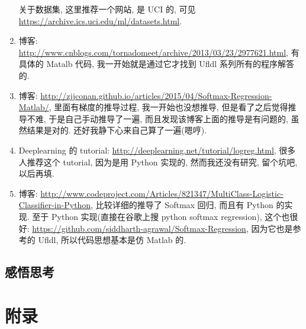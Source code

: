 \documentclass[a4paper,UTF8]{ctexart}
\theoremstyle{plain} \newtheorem{theorem}{定理}[section]
\theoremstyle{plain} \newtheorem{definition}{定义}[section]
\theoremstyle{plain} \newtheorem{lemma}{引理}[section]
\theoremstyle{plain} \newtheorem{proposition}{命题}[section]
\theoremstyle{plain} \newtheorem{example}{例}[section]
\theoremstyle{plain} \newtheorem{remark}{注}[section]
\theoremstyle{plain} \newtheorem{corollary}{推论}[section]
\begin{document}
\begin{enumerate}[(1)]
关于数据集, 这里推荐一个网站, 是 UCI 的, 可见 \url{https://archive.ics.uci.edu/ml/datasets.html}.

\item 博客: \url{http://www.cnblogs.com/tornadomeet/archive/2013/03/23/2977621.html}, 有具体的 Matalb 代码, 我一开始就是通过它才找到 Ufldl 系列所有的程序解答的.

\item 博客: \url{http://zjjconan.github.io/articles/2015/04/Softmax-Regression-Matlab/}, 里面有梯度的推导过程, 我一开始也没想推导, 但是看了之后觉得推导不难, 于是自己手动推导了一遍, 而且发现该博客上面的推导是有问题的, 虽然结果是对的. 还好我静下心来自己算了一遍(嗯哼).

\item Deeplearning 的 tutorial: \url{http://deeplearning.net/tutorial/logreg.html}, 很多人推荐这个 tutorial, 因为是用 Python 实现的, 然而我还没有研究, 留个坑吧, 以后再填.

\item 博客: \url{http://www.codeproject.com/Articles/821347/MultiClass-Logistic-Classifier-in-Python}, 比较详细的推导了 Softmax 回归, 而且有 Python 的实现. 至于 Python 实现(直接在谷歌上搜 python softmax regression), 这个也很好: \url{https://github.com/siddharth-agrawal/Softmax-Regression}, 因为它也是参考的 Ufldl, 所以代码思想基本是仿 Matlab 的.

\end{enumerate}


\subsection{感悟思考}



\newpage

\section*{附录}
\end{document}
